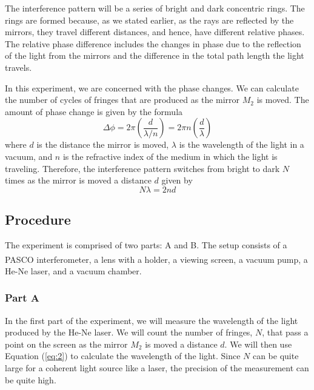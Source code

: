 \documentclass[10pt]{article}
\begin{document}
The interference pattern will be a series of bright and dark concentric rings. The rings are formed because, as we stated earlier, as the rays are reflected by the mirrors, they travel different distances, and hence, have different relative phases. The relative phase difference includes the changes in phase due to the reflection of the light from the mirrors and the difference in the total path length the light travels. 

In this experiment, we are concerned with the phase changes. We can calculate the number of cycles of fringes that are produced as the mirror $M_2$ is moved. The amount of phase change is given by the formula
\begin{equation}
  \Delta \phi = 2 \pi \left(\dfrac{d}{\lambda/n}\right) = 2 \pi n \left(\dfrac{d}{\lambda}\right)
  \label{eq:1}
\end{equation}
where $d$ is the distance the mirror is moved, $\lambda$ is the wavelength of the light in a vacuum, and $n$ is the refractive index of the medium in which the light is traveling. Therefore, the interference pattern switches from bright to dark $N$ times as the mirror is moved a distance $d$ given by
\begin{equation}
  N \lambda = 2 n d
  \label{eq:2}
\end{equation}

\subsection*{Procedure}

The experiment is comprised of two parts: A and B. The setup consists of a PASCO{\textsuperscript\textregistered} interferometer, a lens with a holder, a viewing screen, a vacuum pump, a He-Ne laser, and a vacuum chamber.

\subsubsection*{Part A}

In the first part of the experiment, we will measure the wavelength of the light produced by the He-Ne laser. We will count the number of fringes, $N$, that pass a point on the screen as the mirror $M_2$ is moved a distance $d$. We will then use Equation (\ref{eq:2}) to calculate the wavelength of the light. Since $N$ can be quite large for a coherent light source like a laser, the precision of the measurement can be quite high. 
\end{document}
